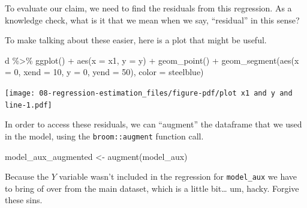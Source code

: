 \documentclass[
  letterpaper,
  DIV=11,
  numbers=noendperiod]{scrreprt}
\newenvironment{Shaded}{\begin{snugshade}}{\end{snugshade}}
\newcommand{\AttributeTok}[1]{\textcolor[rgb]{0.40,0.45,0.13}{#1}}
\newcommand{\DecValTok}[1]{\textcolor[rgb]{0.68,0.00,0.00}{#1}}
\newcommand{\FunctionTok}[1]{\textcolor[rgb]{0.28,0.35,0.67}{#1}}
\newcommand{\NormalTok}[1]{\textcolor[rgb]{0.00,0.23,0.31}{#1}}
\newcommand{\OtherTok}[1]{\textcolor[rgb]{0.00,0.23,0.31}{#1}}
\newcommand{\SpecialCharTok}[1]{\textcolor[rgb]{0.37,0.37,0.37}{#1}}
\newcommand{\StringTok}[1]{\textcolor[rgb]{0.13,0.47,0.30}{#1}}
\begin{document}
To evaluate our claim, we need to find the residuals from this
regression. As a knowledge check, what is it that we mean when we say,
``residual'' in this sense?

To make talking about these easier, here is a plot that might be useful.

\begin{Shaded}
\begin{Highlighting}[]
\NormalTok{d }\SpecialCharTok{\%\textgreater{}\%} 
  \FunctionTok{ggplot}\NormalTok{() }\SpecialCharTok{+} 
  \FunctionTok{aes}\NormalTok{(}\AttributeTok{x =}\NormalTok{ x1, }\AttributeTok{y =}\NormalTok{ y) }\SpecialCharTok{+} 
  \FunctionTok{geom\_point}\NormalTok{() }\SpecialCharTok{+} 
  \FunctionTok{geom\_segment}\NormalTok{(}\FunctionTok{aes}\NormalTok{(}\AttributeTok{x =} \DecValTok{0}\NormalTok{, }\AttributeTok{xend =} \DecValTok{10}\NormalTok{, }\AttributeTok{y =} \DecValTok{0}\NormalTok{, }\AttributeTok{yend =} \DecValTok{50}\NormalTok{), }\AttributeTok{color =} \StringTok{\textquotesingle{}steelblue\textquotesingle{}}\NormalTok{)}
\end{Highlighting}
\end{Shaded}

\texttt{[image: 08-regression-estimation\_files/figure-pdf/plot x1 and y and line-1.pdf]}

In order to access these residuals, we can ``augment'' the dataframe
that we used in the model, using the \texttt{broom::augment} function
call.

\begin{Shaded}
\begin{Highlighting}[]
\NormalTok{model\_aux\_augmented }\OtherTok{\textless{}{-}} \FunctionTok{augment}\NormalTok{(model\_aux)}
\end{Highlighting}
\end{Shaded}

Because the \(Y\) variable wasn't included in the regression for
\texttt{model\_aux} we have to bring of over from the main dataset,
which is a little bit\ldots{} um, hacky. Forgive these sins.

\begin{Shaded}
\end{Shaded}
\end{document}
